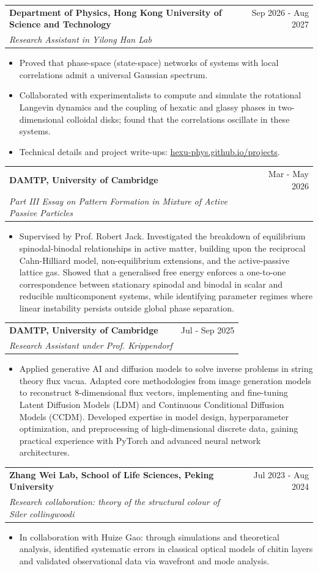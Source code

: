 \documentclass[letterpaper,11pt]{article}
\makeatletter
\newcommand{\resumeItem}[1]{
  \item\small{
    {#1 \vspace{-1pt}}
  }
}
\newcommand{\resumeSubheading}[4]{
  \vspace{-1pt}\item
    \begin{tabular*}{\textwidth}[t]{l@{\extracolsep{\fill}}r}
      \textbf{#1} & {\color{dark-grey}\small #2}\vspace{1pt}\\ %
      \textit{#3} & {\color{dark-grey} \small #4}\\ %
    \end{tabular*}\vspace{-4pt}
}
\newcommand{\resumeItemListStart}{\begin{itemize}}
\newcommand{\resumeItemListEnd}{\end{itemize}\vspace{0pt}}
\makeatother
\begin{document}
    \resumeSubheading
      {Department of Physics, Hong Kong University of Science and Technology}{Sep 2026 - Aug 2027}
      {Research Assistant in Yilong Han Lab}{}
      \resumeItemListStart
        \resumeItem{Proved that phase-space (state-space) networks of systems with local correlations admit a universal Gaussian spectrum.}
        \resumeItem{Collaborated with experimentalists to compute and simulate the rotational Langevin dynamics and the coupling of hexatic and glassy phases in two-dimensional colloidal disks; found that the correlations oscillate in these systems.}
        \resumeItem{Technical details and project write-ups: \href{https://hexu-phys.github.io/projects}{hexu-phys.github.io/projects}.}
      \resumeItemListEnd
      
    \resumeSubheading
      {DAMTP, University of Cambridge}{Mar - May 2026}
      {Part III Essay on Pattern Formation in Mixture of Active Passive Particles}{}
      \resumeItemListStart
        \resumeItem{Supervised by Prof. Robert Jack. Investigated the breakdown of equilibrium spinodal-binodal relationships in active matter, building upon the reciprocal Cahn-Hilliard model, non-equilibrium extensions, and the active-passive lattice gas. Showed that a generalised free energy enforces a one-to-one correspondence between stationary spinodal and binodal in scalar and reducible multicomponent systems, while identifying parameter regimes where linear instability persists outside global phase separation.}
      \resumeItemListEnd

    \resumeSubheading
      {DAMTP, University of Cambridge}{Jul - Sep 2025}
      {Research Assistant under Prof. Krippendorf}{}
      \resumeItemListStart
        \resumeItem{Applied generative AI and diffusion models to solve inverse problems in string theory flux vacua. Adapted core methodologies from image generation models to reconstruct 8-dimensional flux vectors, implementing and fine-tuning Latent Diffusion Models (LDM) and Continuous Conditional Diffusion Models (CCDM). Developed expertise in model design, hyperparameter optimization, and preprocessing of high-dimensional discrete data, gaining practical experience with PyTorch and advanced neural network architectures.}
      \resumeItemListEnd

    \resumeSubheading
      {Zhang Wei Lab, School of Life Sciences, Peking University}{Jul 2023 - Aug 2024}
      {Research collaboration: theory of the structural colour of Siler collingwoodi}{}
      \resumeItemListStart
        \resumeItem{In collaboration with Huize Gao: through simulations and theoretical analysis, identified systematic errors in classical optical models of chitin layers and validated observational data via wavefront and mode analysis.}
      \resumeItemListEnd
      
\end{document}
